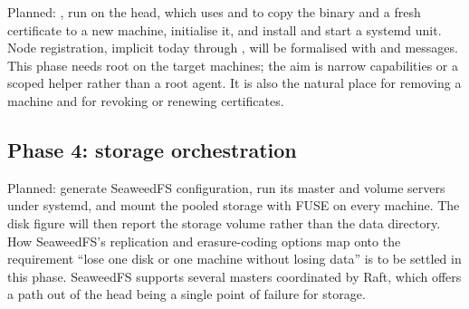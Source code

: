 \documentclass{article}
\begin{document}
Planned: , run on the head, which uses 
and  to copy the binary and a fresh certificate to a new
machine, initialise it, and install and start a systemd unit. Node
registration, implicit today through , will be formalised
with  and  messages. This phase needs
root on the target machines; the aim is narrow capabilities or a scoped
helper rather than a root agent. It is also the natural place for
removing a machine and for revoking or renewing certificates.

\subsection{Phase 4: storage orchestration}

Planned: generate SeaweedFS configuration, run its master and volume
servers under systemd, and mount the pooled storage with FUSE on every
machine. The disk figure will then report the storage volume rather than
the data directory. How SeaweedFS's replication and erasure-coding options
map onto the requirement ``lose one disk or one machine without losing
data'' is to be settled in this phase. SeaweedFS supports several masters
coordinated by Raft, which offers a path out of the head being a single
point of failure for storage.
\end{document}
